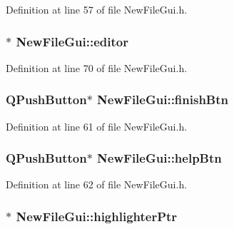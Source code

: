 Definition at line 57 of file New\-File\-Gui.\-h.

\hypertarget{class_new_file_gui_a7521ff2d2934c4a19fbef21a3a034ee9}{
\subsubsection[{editor}]{$\ast$ New\-File\-Gui\-::editor\hspace{0.3cm}{\ttfamily [private]}}}\label{class_new_file_gui_a7521ff2d2934c4a19fbef21a3a034ee9}


Definition at line 70 of file New\-File\-Gui.\-h.

\hypertarget{class_new_file_gui_a9caaf4a098bc03388235461844770705}{
\subsubsection[{finish\-Btn}]{\setlength{\rightskip}{0pt plus 5cm}Q\-Push\-Button$\ast$ New\-File\-Gui\-::finish\-Btn\hspace{0.3cm}{\ttfamily [private]}}}\label{class_new_file_gui_a9caaf4a098bc03388235461844770705}


Definition at line 61 of file New\-File\-Gui.\-h.

\hypertarget{class_new_file_gui_a3a59cd57999cc1004a95ab2fbb3e6766}{
\subsubsection[{help\-Btn}]{\setlength{\rightskip}{0pt plus 5cm}Q\-Push\-Button$\ast$ New\-File\-Gui\-::help\-Btn\hspace{0.3cm}{\ttfamily [private]}}}\label{class_new_file_gui_a3a59cd57999cc1004a95ab2fbb3e6766}


Definition at line 62 of file New\-File\-Gui.\-h.

\hypertarget{class_new_file_gui_a4a63ed16985eeb14fbe35e3197420873}{
\subsubsection[{highlighter\-Ptr}]{$\ast$ New\-File\-Gui\-::highlighter\-Ptr\hspace{0.3cm}{\ttfamily [private]}}}\label{class_new_file_gui_a4a63ed16985eeb14fbe35e3197420873}


